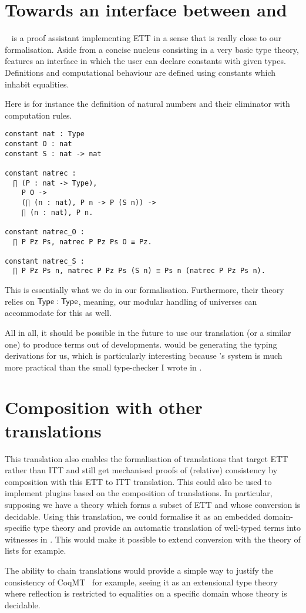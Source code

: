 \section{Towards an interface between \Andromeda and \Coq}

\Andromeda~ is a proof assistant implementing \acrshort{ETT}
in a sense that is really close to our formalisation. Aside from a concise
nucleus consisting in a very basic type theory, \Andromeda features an interface
in which the user can declare constants with given types. Definitions and
computational behaviour are defined using constants which inhabit equalities.

Here is for instance the definition of natural numbers and their eliminator
with computation rules.
\begin{verbatim}
constant nat : Type
constant O : nat
constant S : nat -> nat

constant natrec :
  ∏ (P : nat -> Type),
    P O ->
    (∏ (n : nat), P n -> P (S n)) ->
    ∏ (n : nat), P n.

constant natrec_O :
  ∏ P Pz Ps, natrec P Pz Ps O ≡ Pz.

constant natrec_S :
  ∏ P Pz Ps n, natrec P Pz Ps (S n) ≡ Ps n (natrec P Pz Ps n).
\end{verbatim}
This is essentially what we do in our formalisation.
Furthermore, their theory relies on $\mathsf{Type} : \mathsf{Type}$, meaning, our modular
handling of universes can accommodate for this as well.

All in all, it should be possible in the future to use our translation
(or a similar one) to produce \Coq terms out of \Andromeda developments.
\Andromeda would be generating the typing derivations for us, which is
particularly interesting because \Andromeda's system is much more practical
than the small type-checker I wrote in \Coq.

\section{Composition with other translations}

This translation also enables the formalisation of translations that
target \acrshort{ETT} rather than \acrshort{ITT} and still get mechanised proofs
of (relative) consistency by composition with this \acrshort{ETT} to
\acrshort{ITT} translation.
This could also be used to implement plugins based on the composition of
translations. In particular, supposing we have a theory which forms a
subset of \acrshort{ETT} and whose conversion is decidable. Using this
translation, we could formalise it as an embedded domain-specific type theory
and provide an automatic translation of well-typed terms into witnesses in
\Coq. This would make it possible to extend conversion with the theory
of lists for example.

The ability to chain translations would provide a simple way to justify the
consistency of \acrshort{CoqMT}~ for
example, seeing it as an extensional type theory where reflection is restricted
to equalities on a specific domain whose theory is decidable.